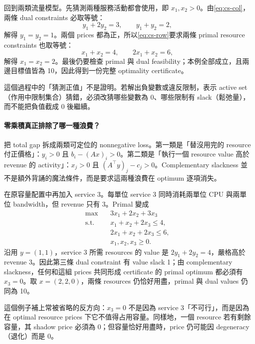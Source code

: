 \documentclass[11pt,a4paper,oneside,openany]{book}
\begin{document}
\begin{example}
回到兩類流量模型。先猜測兩種服務活動都會使用，即 $x_1,x_2>0$。由\cref{eq:cs-col}，兩條 dual constraints 必取等號：
\[
 y_1+2y_2=3,\qquad y_1+y_2=2,
\]
解得 $y_1=y_2=1$。兩個 prices 都為正，所以\cref{eq:cs-row}要求兩條 primal resource constraints 也取等號：
\[
 x_1+x_2=4,\qquad 2x_1+x_2=6,
\]
解得 $x_1=x_2=2$。最後仍要檢查 primal 與 dual feasibility；本例全部成立，且兩邊目標值皆為 10，因此得到一份完整 optimality certificate。

這個過程中的「猜測正值」不是證明。若解出負變數或違反限制，表示 active set（作用中限制集合）猜錯，必須改猜哪些變數為 0、哪些限制有 slack（鬆弛量），而不能把負值截成 0 後繼續。
\end{example}

\paragraph{零乘積真正排除了哪一種浪費？}
 把 total gap 拆成兩類可定位的 nonnegative loss。第一類是「替沒用完的 resource 付正價格」：$y_i>0$ 且 $b_i-(Ax)_i>0$。第二類是「執行一個 resource value 高於 revenue 的 activity」：$x_j>0$ 且 $(A^\top y)_j-c_j>0$。Complementary slackness 並不是額外背誦的魔法條件，而是要求這兩種浪費在 optimum 逐項消失。

\begin{example}
在原容量配置中再加入 service 3。每單位 service 3 同時消耗兩單位 CPU 與兩單位 bandwidth，但 revenue 只有 3。Primal 變成
\begin{align*}
\max\quad &3x_1+2x_2+3x_3\\
\text{s.t.}\quad
&x_1+x_2+2x_3\le4,\\
&2x_1+x_2+2x_3\le6,\\
&x_1,x_2,x_3\ge0.
\end{align*}
沿用 $y=(1,1)$，service 3 所需 resources 的 value 是 $2y_1+2y_2=4$，嚴格高於 revenue 3。因此第三條 dual constraint 有 value slack 1；由 complementary slackness，任何和這組 prices 共同形成 certificate 的 primal optimum 都必須有 $x_3=0$。取 $x=(2,2,0)$，兩條 resources 仍恰好用盡，primal 與 dual values 仍同為 10。

這個例子補上常被省略的反方向：$x_3=0$ 不是因為 service 3「不可行」，而是因為在 optimal resource prices 下它不值得占用容量。同樣地，一個 resource 若有剩餘容量，其 shadow price 必須為 0；但容量恰好用盡時，price 仍可能因 degeneracy（退化）而是 0。
\end{example}
\end{document}
